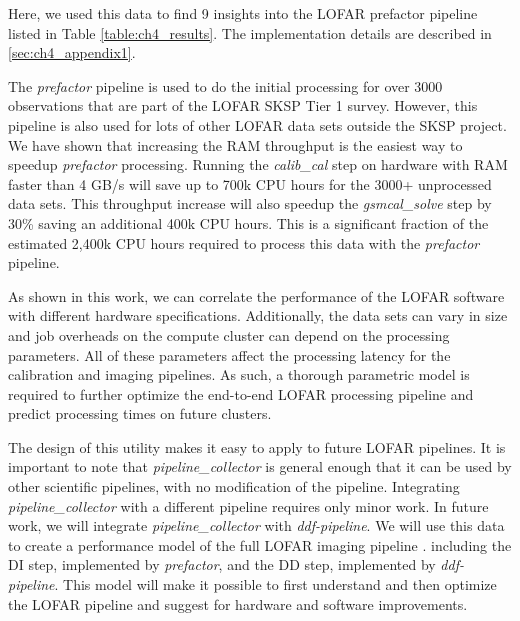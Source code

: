 Here, we used this data to find 9 insights into the LOFAR prefactor pipeline listed in Table \ref{table:ch4_results}. The implementation details are described in \ref{sec:ch4_appendix1}.

The \textit{prefactor} pipeline is used to do the initial processing for over 3000 observations that are part of the LOFAR SKSP Tier 1 survey. However, this pipeline is also used for lots of other LOFAR data sets outside the SKSP project. We have shown that increasing the RAM throughput is the easiest way to speedup \textit{prefactor} processing. Running the \textit{calib\_cal} step on hardware with RAM faster than 4 GB/s will save up to 700k CPU hours for the 3000+ unprocessed data sets. This throughput increase will also speedup the \textit{gsmcal\_solve} step by 30\% saving an additional 400k CPU hours. This is a significant fraction of the estimated 2,400k CPU hours required to process this data with the \textit{prefactor} pipeline. 

As shown in this work, we can correlate the performance of the LOFAR software with different hardware specifications. Additionally, the data sets  can vary in size and job overheads on the compute cluster can depend on the processing parameters. All of these parameters affect the processing latency for the calibration and imaging pipelines. As such, a thorough parametric model is required to further optimize the end-to-end LOFAR processing pipeline and predict processing times on future clusters.

The design of this utility makes it easy to apply to future LOFAR pipelines. It is important to note that \textit{pipeline\_collector} is general enough that it can be used by other scientific pipelines, with no modification of the pipeline. Integrating \textit{pipeline\_collector} with a different pipeline requires only minor work. In future work, we will integrate \textit{pipeline\_collector} with \textit{ddf-pipeline}. We will use this data to create a performance model of the full LOFAR imaging pipeline \citep{lvanweeren2016,Wendy_bootes,tassesmirnov}.  including the DI step, implemented by \textit{prefactor}, and  the DD step, implemented by \textit{ddf-pipeline}. This model will make it possible to first understand and then optimize the LOFAR pipeline and suggest for hardware and software improvements. 



